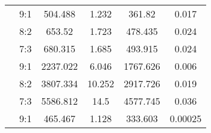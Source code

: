 \documentclass{ieeeojies}
\begin{document}
\begin{table}[H]
\begin{tabular}{|c|c|c|c|c|c|}
\rowcolor[HTML]{FFB6AF} 
\cellcolor[HTML]{FFB6AF}{\color[HTML]{000000} }                                                                                         & {\color[HTML]{000000} 9:1}            & {\color[HTML]{000000} 504.488}       & {\color[HTML]{000000} 1.232}         & {\color[HTML]{000000} 361.82}       & {\color[HTML]{000000} 0.017}         \\ \cline{2-6} 
\rowcolor[HTML]{FFB6AF} 
\cellcolor[HTML]{FFB6AF}{\color[HTML]{000000} }                                                                                         & {\color[HTML]{000000} 8:2}            & {\color[HTML]{000000} 653.52}        & {\color[HTML]{000000} 1.723}         & {\color[HTML]{000000} 478.435}      & {\color[HTML]{000000} 0.024}         \\ \cline{2-6} 
\rowcolor[HTML]{FFB6AF} 
\multirow{-3}{*}{\cellcolor[HTML]{FFB6AF}{\color[HTML]{000000} \textbf{GNN}}}                                                           & {\color[HTML]{000000} 7:3}            & {\color[HTML]{000000} 680.315}       & {\color[HTML]{000000} 1.685}         & {\color[HTML]{000000} 493.915}      & {\color[HTML]{000000} 0.024}         \\ \hline
\rowcolor[HTML]{FBC193} 
\cellcolor[HTML]{FBC193}{\color[HTML]{000000} }                                                                                         & {\color[HTML]{000000} 9:1}            & {\color[HTML]{000000} 2237.022}      & {\color[HTML]{000000} 6.046}         & {\color[HTML]{000000} 1767.626}     & {\color[HTML]{000000} 0.006}         \\ \cline{2-6} 
\rowcolor[HTML]{FBC193} 
\cellcolor[HTML]{FBC193}{\color[HTML]{000000} }                                                                                         & {\color[HTML]{000000} 8:2}            & {\color[HTML]{000000} 3807.334}      & {\color[HTML]{000000} 10.252}        & {\color[HTML]{000000} 2917.726}     & {\color[HTML]{000000} 0.019}         \\ \cline{2-6} 
\rowcolor[HTML]{FBC193} 
\multirow{-3}{*}{\cellcolor[HTML]{FBC193}{\color[HTML]{000000} \textbf{XGBoost}}}                                                       & {\color[HTML]{000000} 7:3}            & {\color[HTML]{000000} 5586.812}      & {\color[HTML]{000000} 14.5}          & {\color[HTML]{000000} 4577.745}     & {\color[HTML]{000000} 0.036}         \\ \hline
\rowcolor[HTML]{FFB6AF} 
\cellcolor[HTML]{FFB6AF}{\color[HTML]{000000} }                                                                                         & {\color[HTML]{000000} 9:1}            & {\color[HTML]{000000} 465.467}       & {\color[HTML]{000000} 1.128}         & {\color[HTML]{000000} 333.603}      & {\color[HTML]{000000} 0.00025}       \\ \cline{2-6} 

\end{tabular}
\end{table}
\end{document}
